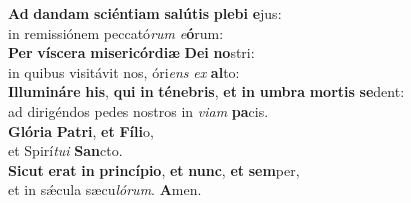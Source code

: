 \evenverse \textbf{Ad} \textbf{dan}\textbf{dam} \textbf{sci}\textbf{én}\textbf{ti}\textbf{am} \textbf{sa}\textbf{lú}\textbf{tis} \textbf{ple}\textbf{bi} \textbf{e}jus:~\*\\
\evenverse in remissiónem peccató\textit{rum} \textit{e}\textbf{ó}rum:\\
\oddverse \textbf{Per} \textbf{ví}\textbf{sce}\textbf{ra} \textbf{mi}\textbf{se}\textbf{ri}\textbf{cór}\textbf{di}\textbf{æ} \textbf{De}\textbf{i} \textbf{no}stri:~\*\\
\oddverse in quibus visitávit nos, óri\textit{ens} \textit{ex} \textbf{al}to:\\
\evenverse \textbf{Il}\textbf{lu}\textbf{mi}\textbf{ná}\textbf{re} \textbf{his}, \textbf{qui} \textbf{in} \textbf{té}\textbf{ne}\textbf{bris}, \textbf{et} \textbf{in} \textbf{um}\textbf{bra} \textbf{mor}\textbf{tis} \textbf{se}dent:~\*\\
\evenverse ad dirigéndos pedes nostros in \textit{vi}\textit{am} \textbf{pa}cis.\\
\oddverse \textbf{Gló}\textbf{ri}\textbf{a} \textbf{Pa}\textbf{tri}, \textbf{et} \textbf{Fí}\textbf{li}o,~\*\\
\oddverse et Spirí\textit{tu}\textit{i} \textbf{San}cto.\\
\evenverse \textbf{Si}\textbf{cut} \textbf{e}\textbf{rat} \textbf{in} \textbf{prin}\textbf{cí}\textbf{pi}\textbf{o}, \textbf{et} \textbf{nunc}, \textbf{et} \textbf{sem}per,~\*\\
\evenverse et in sǽcula sæcu\textit{ló}\textit{rum}. \textbf{A}men.\\
